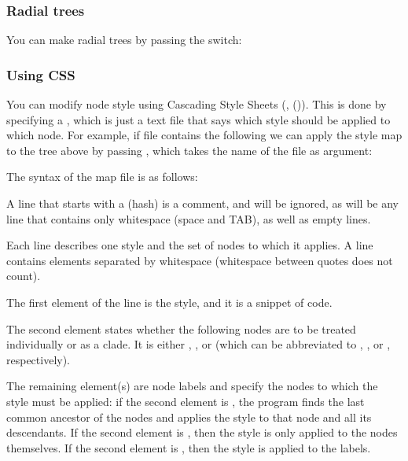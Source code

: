 \subsubsection{Radial trees}

You can make radial trees by passing the  switch:


\subsubsection[sct_display_svg_css]{Using CSS}

You can modify node style using Cascading Style Sheets (\css,
()). This is done by specifying a ,
which is just a text file that says which style should be applied to which node.
For example, if file  contains the following
\startnarrower
{}
\stopnarrower we can apply the style map to
the tree above by passing , which takes the name of the \css{} file
as argument:


The syntax of the \css{} map file is as follows:
\startitemize
	\item A line that starts with a \type{\#} (hash) is a comment, and will be
	ignored, as will be any line that contains only whitespace (space and TAB),
	as well as empty lines.
	\item Each line describes one style and the set of nodes to which it applies.
	A line contains elements separated by whitespace (whitespace between quotes
	does not count). 
	\item The first element of the line is the style, and it is a snippet of
	\css{} code. 
	\item The second element states whether the following nodes are to be treated
	individually or as a clade. It is either ,
	, or  (which can be abbreviated to
	, , or , respectively). 
	\item The remaining element(s) are node labels and specify the nodes to which
	the style must be applied: if the second element is , the
	program finds the last common ancestor of the nodes and applies the style to
	that node and all its descendants. If the second element is
	, then the style is only applied to the nodes themselves.
	If the second element is , then the style is applied to the
	labels.
\stopitemize

